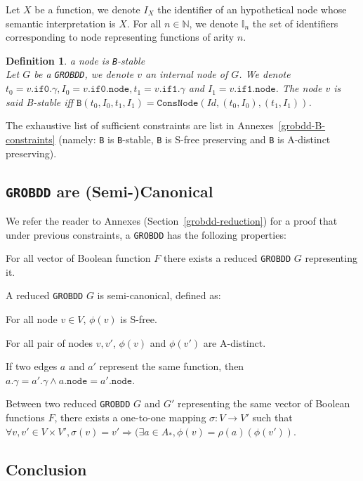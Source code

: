 \documentclass[a4paper,10pt]{article}
\newcommand{\N}{\mathbb{N}}%
\newcommand{\I}{\mathbb{I}}
\newcommand{\GroBdd}{\texttt{GROBDD}}
\newcommand{\fieldNode}{\texttt{node}}
\newcommand{\fieldGamma}{\mathtt{\gamma}}
\newcommand{\fieldThen}{\mathtt{if1}}
\newcommand{\fieldElse}{\mathtt{if0}}
\newtheorem{newdef}{Definition}
\newcommand{\definition}[2]{\begin{newdef}{#1\\}#2\end{newdef}}
\begin{document}
Let $X$ be a function, we denote $I_X$ the identifier of an hypothetical node whose semantic interpretation is $X$.
For all $n\in\N$, we denote $\I_n$ the set of identifiers corresponding to node representing functions of arity $n$.

\definition{a node is \texttt{B}-stable}
{
Let $G$ be a \GroBdd{}, we denote $v$ an internal node of $G$.
We denote $t_0 = v.\fieldElse{}.\fieldGamma{}, I_0 = v.\fieldElse{}.\fieldNode{}, t_1 = v.\fieldThen{}.\fieldGamma{}$ and $I_1 = v.\fieldThen{}.\fieldNode{}$.
The node $v$ is said B-stable iff $\mathtt{B}(t_0, I_0, t_1, I_1) = \mathtt{ConsNode}(Id, (t_0, I_0), (t_1, I_1))$.
}

The exhaustive list of sufficient constraints are list in Annexes~\ref{grobdd-B-constraints} (namely: \texttt{B} is \texttt{B}-stable, \texttt{B} is S-free preserving and \texttt{B} is A-distinct preserving).


\subsection{\GroBdd{} are (Semi-)Canonical}
We refer the reader to Annexes (Section~\ref{grobdd-reduction}) for a proof that under previous constraints, a \GroBdd{} has the follozing properties: \begin{compactenum}
\item For all vector of Boolean function $F$ there exists a reduced \GroBdd{} $G$ representing it.
\item A reduced \GroBdd{} $G$ is semi-canonical, defined as: \begin{compactenum}
\item For all node $v\in V$, $\phi(v)$ is S-free.
\item For all pair of nodes $v, v'$, $\phi(v)$ and $\phi(v')$ are A-distinct.
\item If two edges $a$ and $a'$ represent the same function, then $a.\fieldGamma{} = a'.\fieldGamma{} \land a.\fieldNode{} = a'.\fieldNode{}$.
\end{compactenum}
\item Between two reduced \GroBdd{} $G$ and $G'$ representing the same vector of Boolean functions $F$, there exists a one-to-one mapping $\sigma: V \longrightarrow V'$ such that $\forall v, v' \in V \times V', \sigma(v) = v' \Rightarrow (\exists a \in A_{*}, \phi(v) = \rho(a)(\phi(v'))$.
\end{compactenum}

\subsection{Conclusion}
\end{document}
